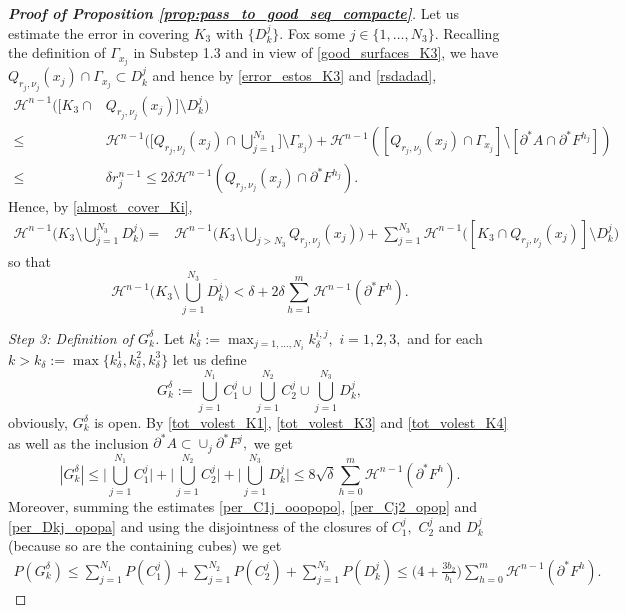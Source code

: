 \documentclass[reqno]{amsart}
\numberwithin{equation}{section}
\theoremstyle{plain}
\theoremstyle{definition}
\newcommand{\cH}{\mathcal{H}}
\newcommand{\p}{\partial}
\newcommand{\cl}[1]{\overline{#1}}
\newcommand{\bound}{b}
\begin{document}
\begin{proof}[\textbf{Proof of Proposition \ref{prop:pass_to_good_seq_compacte}}]
Let us estimate the error in covering $K_3$ with $\{D_k^j\}.$ Fox some $j\in\{1,\ldots,N_3\}.$ Recalling the definition of $\Gamma_{x_j}$ in Substep 1.3 and in view of \eqref{good_surfaces_K3}, we have $Q_{r_j,\nu_j}(x_j)\cap \Gamma_{x_j}\subset D_k^j$ and hence  by \eqref{error_estos_K3} and \eqref{rsdadad},
%
\begin{align*}
\cH^{n-1}([K_3\cap  &  Q_{r_j,\nu_j}(x_j)]   \setminus D_k^j)\\
\le & 
\cH^{n-1}\Big(\Big[Q_{r_j,\nu_j}(x_j) \cap \bigcup_{j=1}^{N_3}\Big]\setminus \Gamma_{x_j}\Big)
+ 
\cH^{n-1}([Q_{r_j,\nu_j}(x_j) \cap \Gamma_{x_j}]\setminus [\p^*A\cap \p^*F^{h_j}])\\
\le & \delta r_j^{n-1} \le 2\delta \cH^{n-1}(Q_{r_j,\nu_j}(x_j) \cap \p^*F^{h_j}).
\end{align*}
Hence, by \eqref{almost_cover_Ki},
\begin{align*}
\cH^{n-1}\Big(K_3\setminus\bigcup_{j=1}^{N_3} D_k^j\Big) = & \cH^{n-1}\Big(K_3\setminus\bigcup_{j>N_3} Q_{r_j,\nu_j}(x_j)\Big) + \sum\limits_{j=1}^{N_3} \cH^{n-1}\Big([K_3\cap Q_{r_j,\nu_j}(x_j)]\setminus D_k^j\Big) 
\end{align*}
so that
\begin{equation}\label{outside_Dkjdelta}
\cH^{n-1}\Big(K_3\setminus \bigcup_{j=1}^{N_3}\cl{D_k^j}\Big)< \delta + 2\delta \sum\limits_{h=1}^m \cH^{n-1}(\p^*F^h).
\end{equation}

{\it Step 3: Definition of $G_k^\delta$.}  
%
Let $k_\delta^i:=\max_{j=1,\ldots,N_i} k_\delta^{i,j},$ $i=1,2,3,$ and for each $k>k_\delta:=\max\{k_\delta^1,k_\delta^2,k_\delta^3\}$ let us define
$$
G_k^\delta:=\bigcup_{j=1}^{N_1} C_1^j \cup \bigcup_{j=1}^{N_2} C_2^j\cup \bigcup\limits_{j=1}^{N_3} D_k^j, 
$$
obviously, $G_k^\delta$ is open. 
By \eqref{tot_volest_K1},  \eqref{tot_volest_K3} and \eqref{tot_volest_K4} as well as the inclusion $\p^*A\subset \cup_j\p^*F^j,$ we get
$$
|G_k^\delta| \le \Big|\bigcup_{j=1}^{N_1} C_1^j\Big| + \Big|\bigcup_{j=1}^{N_2} C_2^j\Big| + \Big|\bigcup\limits_{j=1}^{N_3} D_k^j\Big|
\le 8\sqrt\delta \sum\limits_{h=0}^m \cH^{n-1}(\p^*F^h).
$$
Moreover, summing the estimates  
\eqref{per_C1j_ooopopo}, \eqref{per_Cj2_opop} and
\eqref{per_Dkj_opopa}
and using the disjointness of the closures of $C_1^j,$ $C_2^j$ and $D_k^j$ (because so are the containing cubes) we get
\begin{align*}
P(G_k^\delta) \le  \sum_{j=1}^{N_1} P(C_1^j) + \sum_{j=1}^{N_2} P(C_2^j) +  \sum\limits_{j=1}^{N_3} P(D_k^j)  
\le \Big(4 + \frac{3\bound_2}{\bound_1}\Big)\sum\limits_{h=0}^m \cH^{n-1}(\p^*F^h).
\end{align*} 




\end{proof}
\end{document}
